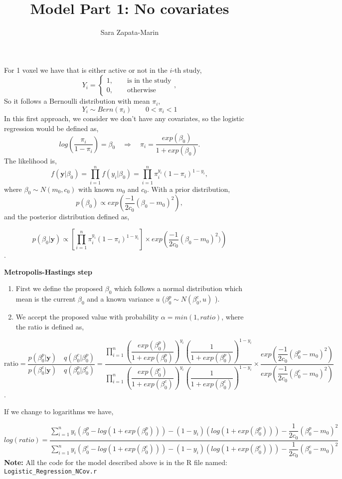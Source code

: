 \documentclass[10pt,a4paper]{article}
\title{Model Part 1: No covariates}
\author{Sara Zapata-Marin}
\begin{document}
\maketitle

For 1 voxel we have that is either active or not in the $i$-th study,
\[ Y_i= 
\begin{cases}
1,\qquad \text{is in the study}\\
0, \qquad \text{otherwise}
\end{cases},
\]
So it follows a Bernoulli distribution with mean $\pi_i$,
\[Y_i \sim Bern(\pi_i) \qquad 0<\pi_i <1\]
In this first approach, we consider we don't have any covariates, so the logistic regression would be defined as,
\[ log \left(\dfrac{\pi_i}{1-\pi_i} \right)=\beta_0 \quad \Rightarrow  \quad \pi_i = \dfrac{exp(\beta_0)}{1+ exp(\beta_0)}. \]
The likelihood is,
\[ f(\textbf{y}| \beta_0)= \prod_{i=1}^{n} f(y_i| \beta_0)=\prod_{i=1}^{n} \pi_i^{y_i}(1-\pi_i)^{1-y_i},\]
where $ \beta_0 \sim N(m_0,c_0) $ with known $m_0$ and $c_0$.
With a prior distribution,
\[
p(\beta_0)\propto exp\left( \dfrac{-1}{2c_0}(\beta_0-m_0)^2 \right),
\]
and the posterior distribution defined as,

\[p(\beta_0|\textbf{y})\propto \left[ \prod_{i=1}^{n} \pi_i^{y_i}(1-\pi_i)^{1-y_i} \right] \times exp\left( \dfrac{-1}{2 c_0}(\beta_0-m_0)^2)\right)\] .

\textbf{Metropolis-Hastings step}

\begin{enumerate}
\item First we define the proposed $\beta_0$ which follows a normal distribution which mean is the current $\beta_0$ and a known variance $u$ ($\beta_0^p \sim N(\beta_0^c,u)$ ).
\item We accept the proposed value with probability $\alpha = min(1, ratio)$, where the ratio is defined as,
\end{enumerate}

\[ \text{ratio}=\dfrac{p(\beta_0^p|\textbf{y})\quad q(\beta_0^c|\beta_0^p)}{p(\beta_0^c|\textbf{y}) \quad q(\beta_0^p|\beta_0^c)}=\dfrac{\prod_{i=1}^n\left(\dfrac{exp(\beta_0^p)}{1+exp(\beta_0^p)}\right)^{y_i}\left( \dfrac{1}{1+exp(\beta_0^p)}\right)^{1-y_i}}{\prod_{i=1}^n\left(\dfrac{exp(\beta_0^c)}{1+exp(\beta_0^c)}\right)^{y_i}\left( \dfrac{1}{1+exp(\beta_0^c)}\right)^{1-y_i}}\times \dfrac{exp\left(\dfrac{-1}{2c_0}(\beta_0^p-m_0)^2\right)}{exp\left(\dfrac{-1}{2c_0}(\beta_0^c-m_0)^2\right)}\].

If we change to logarithms we have,

\[ log(ratio)=
 \dfrac{\sum_{i=1}^n y_i(\beta_0^p-log(1+exp(\beta_0^p)))- (1-y_i)(log(1+exp(\beta_0^p)))-\dfrac{1}{2c_0}(\beta_0^p-m_0)^2}{\sum_{i=1}^n y_i(\beta_0^c-log(1+exp(\beta_0^c)))- (1-y_i)(log(1+exp(\beta_0^c)))-\dfrac{1}{2c_0}(\beta_0^c-m_0)^2}
\]
\textbf{Note:} All the code for the model described above is in the R file named: \texttt{Logistic\_Regression\_NCov.r}
\end{document}
